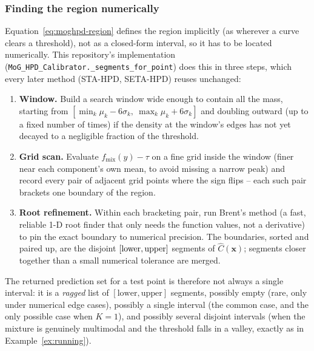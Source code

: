 \documentclass[11pt]{article}
\begin{document}
\subsubsection{Finding the region numerically}
\label{sec:numerics}

Equation~\eqref{eq:moghpd-region} defines the region implicitly (as wherever a curve clears a
threshold), not as a closed-form interval, so it has to be located numerically. This repository's
implementation (\texttt{MoG\_HPD\_Calibrator.\_segments\_for\_point}) does this in three steps,
which every later method (STA-HPD, SETA-HPD) reuses unchanged:
\begin{enumerate}[leftmargin=1.5em]
\item \textbf{Window.} Build a search window wide enough to contain all the mass, starting from
$[\min_k \mu_k - 6\sigma_k,\ \max_k \mu_k + 6\sigma_k]$ and doubling outward (up to a fixed number
of times) if the density at the window's edges has not yet decayed to a negligible fraction of the
threshold.
\item \textbf{Grid scan.} Evaluate $f_{\mathrm{mix}}(y) - \tau$ on a fine grid inside the window
(finer near each component's own mean, to avoid missing a narrow peak) and record every pair of
adjacent grid points where the sign flips -- each such pair brackets one boundary of the region.
\item \textbf{Root refinement.} Within each bracketing pair, run Brent's method (a fast, reliable
1-D root finder that only needs the function values, not a derivative) to pin the exact boundary
to numerical precision. The boundaries, sorted and paired up, are the disjoint $[{\rm lower},{\rm
upper}]$ segments of $\hat C(\bm x)$; segments closer together than a small numerical tolerance
are merged.
\end{enumerate}
The returned prediction set for a test point is therefore not always a single interval: it is a
\emph{ragged} list of $[\text{lower},\text{upper}]$ segments, possibly empty (rare, only under
numerical edge cases), possibly a single interval (the common case, and the only possible case
when $K=1$), and possibly several disjoint intervals (when the mixture is genuinely multimodal and
the threshold falls in a valley, exactly as in Example~\ref{ex:running}).
\end{document}
